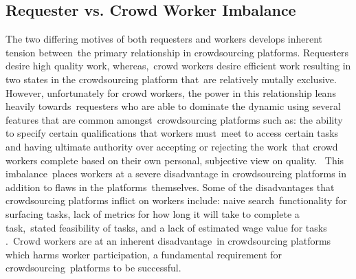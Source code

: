 \documentclass[letterpaper,12pt]{article}
\begin{document}
\subsection{Requester vs. Crowd Worker Imbalance}
The two differing motives of both requesters and workers develops inherent tension between\
the primary relationship in crowdsourcing platforms. Requesters desire high quality work, whereas,\
crowd workers desire efficient work resulting in two states in the crowdsourcing platform that\
are relatively mutally exclusive. However, unfortunately for crowd workers, the power in this relationship leans heavily towards\
requesters who are able to dominate the dynamic using several features that are common amongst\
crowdsourcing platforms such as: the ability to specify certain qualifications that workers must\
meet to access certain tasks and having ultimate authority over accepting or rejecting the work\
that crowd workers complete based on their own personal, subjective view on quality. \cite{Kaplan2018,allahbakhsh2013quality}\
This imbalance\
places workers at a severe disadvantage in crowdsourcing platforms in addition to flaws in the platforms\
themselves. Some of the disadvantages that crowdsourcing platforms inflict on workers include: naive search\
functionality for surfacing tasks, lack of metrics for how long it will take to complete a task,\
stated feasibility of tasks, and a lack of estimated wage value for tasks \cite{Kaplan2018}.\
Crowd workers are at an inherent disadvantage\
in crowdsourcing platforms which harms worker participation, a fundamental requirement for crowdsourcing\
platforms to be successful.
\end{document}
